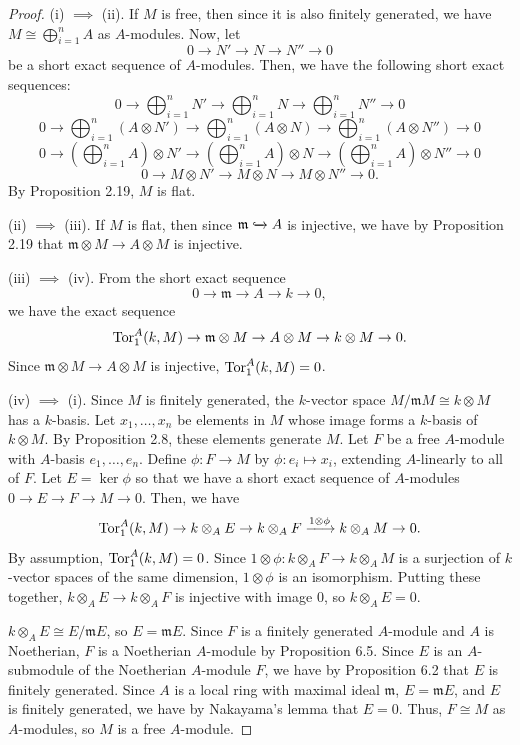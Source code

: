 \begin{proof}
(i) $\implies$ (ii). If $M$ is free, then since it is also finitely generated, we have $M \cong \bigoplus_{i=1}^n A$ as $A$-modules. Now, let
$$0 \to N' \to N \to N'' \to 0$$
be a short exact sequence of $A$-modules. Then, we have the following short exact sequences:
$$0 \to \bigoplus_{i=1}^n N' \to \bigoplus_{i=1}^n N \to \bigoplus_{i=1}^n N'' \to 0$$
$$0 \to \bigoplus_{i=1}^n (A \otimes N') \to \bigoplus_{i=1}^n (A \otimes N) \to \bigoplus_{i=1}^n (A \otimes N'') \to 0$$
$$0 \to \left(\bigoplus_{i=1}^n A\right) \otimes N' \to \left(\bigoplus_{i=1}^n A\right) \otimes N \to \left(\bigoplus_{i=1}^n A\right) \otimes N'' \to 0$$
$$0 \to M \otimes N' \to M \otimes N \to M \otimes N'' \to 0.$$
By Proposition 2.19, $M$ is flat.

(ii) $\implies$ (iii). If $M$ is flat, then since $\mathfrak{m} \xhookrightarrow{} A$ is injective, we have by Proposition 2.19 that 
$\mathfrak{m} \otimes M \to A \otimes M$ is injective.

(iii) $\implies$ (iv). From the short exact sequence
$$0 \to \mathfrak{m} \to A \to k \to 0,$$
we have the exact sequence
$$\operatorname{Tor}_1^A(k,M) \to \mathfrak{m} \otimes M \to A \otimes M \to k \otimes M \to 0.$$
Since $\mathfrak{m} \otimes M \to A \otimes M$ is injective, $\operatorname{Tor}_1^A(k,M) = 0$.

(iv) $\implies$ (i). Since $M$ is finitely generated, the $k$-vector space $M/\mathfrak{m}M \cong k \otimes M$ has a $k$-basis. Let $x_1,\ldots,x_n$ be elements in $M$ whose
image forms a $k$-basis of $k \otimes M$. By Proposition 2.8, these elements generate $M$. Let $F$ be a free $A$-module with $A$-basis $e_1,\ldots,e_n$. Define $\phi : F \to M$
by $\phi : e_i \mapsto x_i$, extending $A$-linearly to all of $F$. Let $E = \ker \phi$ so that we have a short exact sequence of $A$-modules $0 \to E \to F \to M \to 0$.
Then, we have
$$\Tor_1^A(k,M) \to k \otimes_A E \to k \otimes_A F \xlongrightarrow{1 \otimes \phi} k \otimes_A M \to 0.$$
By assumption, $\operatorname{Tor}_1^A(k,M) = 0$. Since $1 \otimes \phi : k \otimes_A F \to k \otimes_A M$ is a surjection of $k$-vector spaces of the same dimension, $1 \otimes \phi$ is an isomorphism.
Putting these together, $k \otimes_A E \to k \otimes_A F$ is injective with image $0$, so $k \otimes_A E = 0$. 

$k \otimes_A E \cong E/\mathfrak{m}E$, so $E = \mathfrak{m}E$. Since $F$ is
a finitely generated $A$-module and $A$ is Noetherian, $F$ is a Noetherian $A$-module by Proposition 6.5. Since $E$ is an $A$-submodule of the Noetherian $A$-module $F$, we have by 
Proposition 6.2 that $E$ is finitely generated. Since $A$ is a local ring with maximal ideal $\mathfrak{m}$, $E = \mathfrak{m}E$, and $E$ is finitely generated, we have by Nakayama's lemma
that $E = 0$. Thus, $F \cong M$ as $A$-modules, so $M$ is a free $A$-module.
\end{proof}

